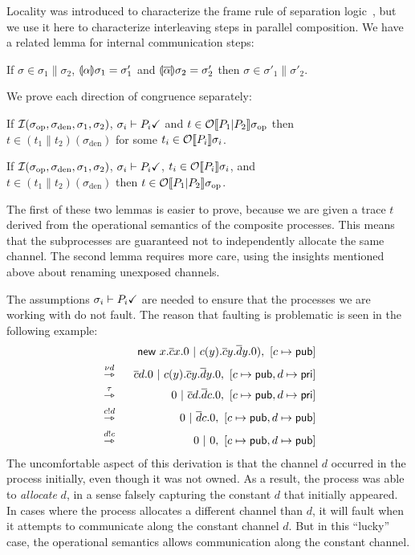 \documentclass{entcs}
\begin{document}
Locality was introduced to characterize the frame rule of separation
logic~\cite{Calcagno2007}, but we use it here to characterize
interleaving steps in parallel composition.  We have a related lemma
for internal communication steps:

\begin{lemma}[Communication]
  If $\sigma \in \sigma_1 \parallel \sigma_2$,
$\llparenthesis \alpha \rrparenthesis \sigma_1 = \sigma'_1$ and $\llparenthesis \overline{\alpha} \rrparenthesis \sigma_2 = \sigma'_2$ then 
    $\sigma \in \sigma'_1 \parallel \sigma'_2$.
\end{lemma}

We prove each direction of congruence separately:
\begin{lemma}
  If $\mathcal{I}(\sigma_{\textrm{op}}, \sigma_{\textrm{den}}, \sigma_1, \sigma_2)$,
  $\sigma_i \vdash P_i \checkmark$ and $t \in \mathcal{O}\!\left\llbracket P_1|P_2 \right\rrbracket \! \sigma_{\textrm{op}}$
  then\\ $t \in (t_1\parallel t_2)(\sigma_{\textrm{den}})$ for some
  $t_i \in \mathcal{O}\!\left\llbracket P_i \right\rrbracket \! \sigma_i$.
\end{lemma}
\begin{lemma}
  If $\mathcal{I}(\sigma_{\textrm{op}}, \sigma_{\textrm{den}}, \sigma_1, \sigma_2)$,
  $\sigma_i \vdash P_i \checkmark$, $t_i \in \mathcal{O}\!\left\llbracket P_i \right\rrbracket \! \sigma_i$, and \\
  $t \in (t_1\parallel t_2)(\sigma_{\textrm{den}})$ then 
$t \in \mathcal{O}\!\left\llbracket P_1|P_2 \right\rrbracket \! \sigma_{\textrm{op}}$.
\end{lemma}
The first of these two lemmas is easier to prove, because we are given
a trace $t$ derived from the operational semantics of the composite
processes.  This means that the subprocesses are guaranteed not to
independently allocate the same channel.  The second lemma requires
more care, using the insights mentioned above about renaming unexposed
channels.

The assumptions $\sigma_i \vdash P_i \checkmark$ are needed to ensure that
the processes we are working with do not fault.  The reason that
faulting is problematic is seen in the following example:
\begin{eqnarray*}
&&  \textsf{new } x.\overline{c}x.0\ |\ c(y).\overline{c}y.\overline{d}y.0),\ [c \mapsto \textsf{pub}] \\
&\stackrel{\nu d}{\rightarrowtriangle}\ \ &
  \overline{c}d.0\ |\ c(y).\overline{c}y.\overline{d}y.0,\ [c \mapsto \textsf{pub}, d \mapsto \textsf{pri}] \\
&\stackrel{\tau}{\rightarrowtriangle}\ \ &
  0\ |\ \overline{c}d.\overline{d}c.0,\ [c \mapsto \textsf{pub}, d\mapsto\textsf{pri}] \\
&\stackrel{c!d}{\rightarrowtriangle}\ \ &
  0\ |\ \overline{d}c.0,\ [c \mapsto \textsf{pub}, d\mapsto\textsf{pub}] \\
&\stackrel{d!c}{\rightarrowtriangle}\ \ &
  0\ |\ 0,\ [c \mapsto \textsf{pub}, d\mapsto\textsf{pub}] 
\end{eqnarray*}
The uncomfortable aspect of this derivation is that the channel $d$
occurred in the process initially, even though it was not owned.  As a
result, the process was able to \emph{allocate} $d$, in a sense
falsely capturing the constant $d$ that initially appeared.  In cases
where the process allocates a different channel than $d$, it will
fault when it attempts to communicate along the constant channel $d$.
But in this ``lucky'' case, the operational semantics allows
communication along the constant channel.
\end{document}
